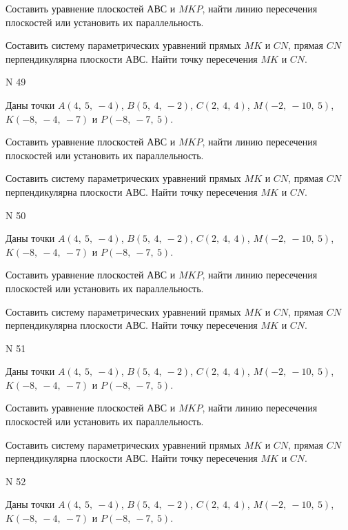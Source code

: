 \documentclass[11pt]{report}
\begin{document}
Составить уравнение плоскостей $АВС$ и $MKP$,
найти линию пересечения плоскостей или установить их параллельность.

Составить систему параметрических уравнений прямых $MK$ и $CN$,
прямая $CN$ перпендикулярна плоскости $АВС$. 
Найти точку пересечения $MK$ и $CN$.



 N 49

Даны точки $A\left( 4, \  5, \  -4\right)$, $B\left( 5, \  4, \  -2\right)$, $C\left( 2, \  4, \  4\right)$, $M\left( -2, \  -10, \  5\right)$, $K\left( -8, \  -4, \  -7\right)$ и $P\left( -8, \  -7, \  5\right)$.


Составить уравнение плоскостей $АВС$ и $MKP$,
найти линию пересечения плоскостей или установить их параллельность.

Составить систему параметрических уравнений прямых $MK$ и $CN$,
прямая $CN$ перпендикулярна плоскости $АВС$. 
Найти точку пересечения $MK$ и $CN$.



 N 50

Даны точки $A\left( 4, \  5, \  -4\right)$, $B\left( 5, \  4, \  -2\right)$, $C\left( 2, \  4, \  4\right)$, $M\left( -2, \  -10, \  5\right)$, $K\left( -8, \  -4, \  -7\right)$ и $P\left( -8, \  -7, \  5\right)$.


Составить уравнение плоскостей $АВС$ и $MKP$,
найти линию пересечения плоскостей или установить их параллельность.

Составить систему параметрических уравнений прямых $MK$ и $CN$,
прямая $CN$ перпендикулярна плоскости $АВС$. 
Найти точку пересечения $MK$ и $CN$.



 N 51

Даны точки $A\left( 4, \  5, \  -4\right)$, $B\left( 5, \  4, \  -2\right)$, $C\left( 2, \  4, \  4\right)$, $M\left( -2, \  -10, \  5\right)$, $K\left( -8, \  -4, \  -7\right)$ и $P\left( -8, \  -7, \  5\right)$.


Составить уравнение плоскостей $АВС$ и $MKP$,
найти линию пересечения плоскостей или установить их параллельность.

Составить систему параметрических уравнений прямых $MK$ и $CN$,
прямая $CN$ перпендикулярна плоскости $АВС$. 
Найти точку пересечения $MK$ и $CN$.



 N 52

Даны точки $A\left( 4, \  5, \  -4\right)$, $B\left( 5, \  4, \  -2\right)$, $C\left( 2, \  4, \  4\right)$, $M\left( -2, \  -10, \  5\right)$, $K\left( -8, \  -4, \  -7\right)$ и $P\left( -8, \  -7, \  5\right)$.
\end{document}
